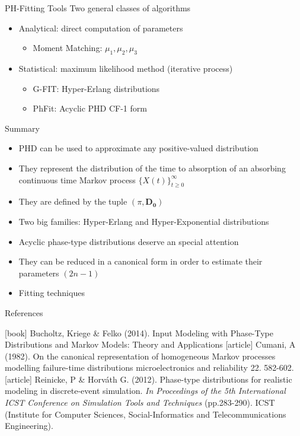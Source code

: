 \documentclass[envcountset]{beamer}
\theoremstyle{definition}
\begin{document}
\begin{frame}{PH-Fitting Tools}
Two general classes of algorithms
\begin{itemize}
\item Analytical: direct computation of parameters
	\begin{itemize}
	\item Moment Matching: $\mu_1, \mu_2, \mu_3$ 
	\end{itemize}
\item Statistical: maximum likelihood method (iterative process)
	\begin{itemize}
	\item G-FIT: Hyper-Erlang distributions
	\item PhFit: Acyclic PHD CF-1 form  
	\end{itemize}
\end{itemize}

\end{frame}

\begin{frame}{Summary}

\begin{itemize}
\item PHD can be used to approximate any positive-valued distribution
\item They represent the distribution of the time to absorption of an absorbing continuous time Markov process $\{X(t)\}_{t\geq0}^{\infty}$ 
\item They are defined by the tuple $(\pi, \mathbf{D_0})$
\item Two big families: Hyper-Erlang and Hyper-Exponential distributions
\item Acyclic phase-type distributions deserve an special attention
\item They can be reduced in a canonical form in order to estimate their parameters $(2n-1)$
\item Fitting techniques
\end{itemize}

\end{frame}

\begin{frame}{References}

\begin{thebibliography}{2}
\footnotesize{
[book]
 Bucholtz, Kriege \& Felko (2014). Input Modeling with Phase-Type Distributions and Markov Models: Theory and Applications 
[article]
 Cumani, A (1982). On the canonical representation of homogeneous Markov processes modelling failure-time distributions microelectronics and reliability 22. 582-602.
[article]
 Reinicke, P \& Horváth G. (2012). Phase-type distributions for realistic modeling in discrete-event simulation. \textit{In Proceedings of the 5th International ICST Conference on Simulation Tools and Techniques} (pp.283-290). ICST (Institute for Computer Sciences, Social-Informatics and Telecommunications Engineering).}

\end{thebibliography}

\end{frame}
\end{document}
